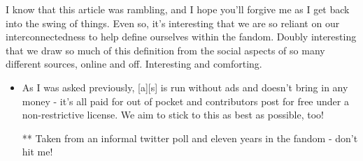 I know that this article was rambling, and I hope you'll forgive me as I get back into the swing of things. Even so, it's interesting that we are so reliant on our interconnectedness to help define ourselves within the fandom. Doubly interesting that we draw so much of this definition from the social aspects of so many different sources, online and off. Interesting and comforting.

\begin{itemize}
\tightlist
\item
  As I was asked previously, {[}a{]}{[}s{]} is run without ads and doesn't bring in any money - it's all paid for out of pocket and contributors post for free under a non-restrictive license. We aim to stick to this as best as possible, too!

  ** Taken from an informal twitter poll and eleven years in the fandom - don't hit me!
\end{itemize}
